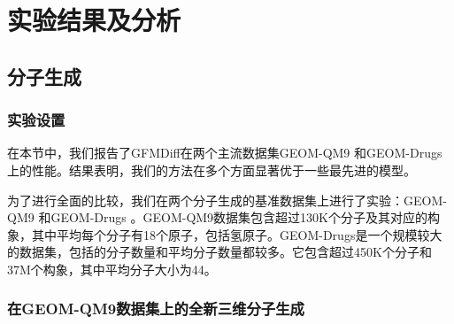 \chapter[实验结果及分析]{实验结果及分析}
\label{chap:experiment}

\section{分子生成}

\subsection{实验设置}
在本节中，我们报告了GFMDiff在两个主流数据集GEOM-QM9 \cite{qm9_ramakrishnan_14}和GEOM-Drugs \cite{drugs_axelrod_22}上的性能。结果表明，我们的方法在多个方面显著优于一些最先进的模型。

为了进行全面的比较，我们在两个分子生成的基准数据集上进行了实验：GEOM-QM9 \cite{qm9_ramakrishnan_14}和GEOM-Drugs \cite{drugs_axelrod_22}。GEOM-QM9数据集包含超过130K个分子及其对应的构象，其中平均每个分子有18个原子，包括氢原子。GEOM-Drugs是一个规模较大的数据集，包括的分子数量和平均分子数量都较多。它包含超过450K个分子和37M个构象，其中平均分子大小为44。

\subsection{在GEOM-QM9数据集上的全新三维分子生成}


